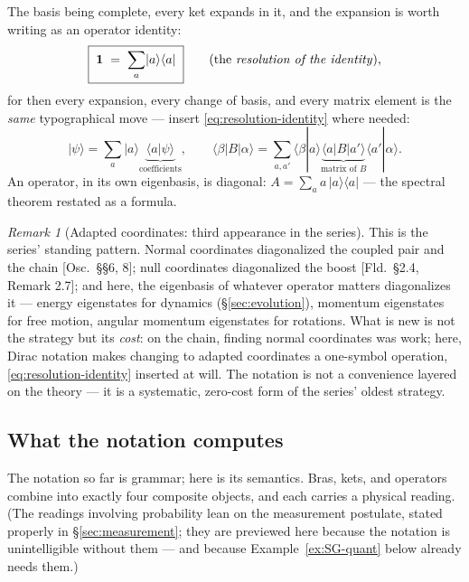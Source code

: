 \documentclass[11pt]{article}
\theoremstyle{plain}
\theoremstyle{definition}
\theoremstyle{remark}
\newtheorem{remark}[theorem]{Remark}
\newcommand{\idop}{\mathbf{1}}  %
\newcommand{\ket}[1]{\lvert #1 \rangle}
\newcommand{\bra}[1]{\langle #1 \rvert}
\newcommand{\braket}[2]{\langle #1 | #2 \rangle}
\begin{document}
\noindent
The basis being complete, every ket expands in it, and the expansion
is worth writing as an operator identity:
\begin{equation}
  \boxed{\;
  \idop \;=\; \sum_{a} \ket a\bra a
  \;}
  \qquad\text{(the \emph{resolution of the identity}),}
  \label{eq:resolution-identity}
\end{equation}
for then every expansion, every change of basis, and every matrix
element is the \emph{same} typographical move --- insert
\eqref{eq:resolution-identity} where needed:
\begin{equation}
  \ket\psi = \sum_a \ket a\underbrace{\braket a\psi}_{\text{coefficients}},
  \qquad
  \bra\beta B\ket\alpha
  = \sum_{a,a'}
    \braket\beta a
    \underbrace{\bra a B\ket{a'}}_{\text{matrix of } B}
    \braket{a'\!}\alpha .
\end{equation}
An operator, in its own eigenbasis, is diagonal:
$A = \sum_a a\,\ket a\bra a$ --- the spectral theorem restated as a
formula.

\begin{remark}[Adapted coordinates: third appearance in the series]
\label{rem:adapted-coordinates-qm}
This is the series' standing pattern. Normal coordinates diagonalized the
coupled pair and the chain [Osc.\ \S\S6, 8]; null coordinates
diagonalized the boost [Fld.\ \S2.4, Remark 2.7]; and here, the eigenbasis of whatever
operator matters diagonalizes it --- energy eigenstates for
dynamics (\S\ref{sec:evolution}), momentum eigenstates for free
motion, angular momentum eigenstates for rotations. What is new is
not the strategy but its \emph{cost}: on the chain, finding normal
coordinates was work; here, Dirac notation makes changing to adapted
coordinates a one-symbol operation,
\eqref{eq:resolution-identity} inserted at will. The notation is not
a convenience layered on the theory --- it is a systematic,
zero-cost form of the series' oldest strategy.
\end{remark}

\subsection{What the notation computes}
\label{sec:computational-moves}

The notation so far is grammar; here is its semantics. Bras, kets,
and operators combine into exactly four composite objects, and each
carries a physical reading. (The readings involving probability
lean on the measurement postulate, stated properly in
\S\ref{sec:measurement}; they are previewed here because the
notation is unintelligible without them --- and because
Example~\ref{ex:SG-quant} below already needs them.)
\end{document}
